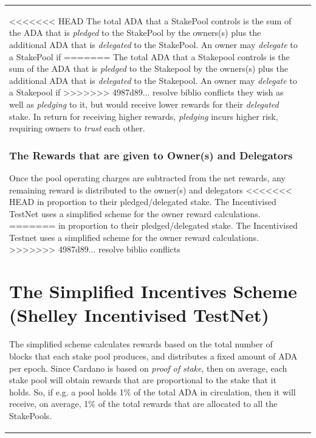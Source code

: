 \documentclass[11pt,a4paper,dvipsnames,twosided,final]{article}
\newcommand{\ada}{ADA{}}
\newcommand{\cardano}[1]{Cardano}
\begin{document}
\begin{tabular}{||l|l||}
\noindent
<<<<<<< HEAD
The total \ada{} that a StakePool controls is the sum of the \ada{} that is \emph{pledged} to the StakePool by the owners(s) plus
the additional \ada{} that is \emph{delegated} to the StakePool.  An owner may \emph{delegate} to a StakePool if
=======
The total \ada{} that a Stakepool controls is the sum of the \ada{} that is \emph{pledged} to the Stakepool by the owners(s) plus
the additional \ada{} that is \emph{delegated} to the Stakepool.  An owner may \emph{delegate} to a Stakepool if
>>>>>>> 4987d89... resolve biblio conflicts
they wish as well as \emph{pledging} to it, but would receive lower rewards for their \emph{delegated} stake.
In return for receiving higher rewards, \emph{pledging} incurs higher risk, requiring owners to \emph{trust} each other.


\subsubsection*{The Rewards that are given to Owner(s) and Delegators}

Once the pool operating charges are subtracted from the net rewards, any remaining reward is distributed to the owner(s) and delegators
<<<<<<< HEAD
in proportion to their pledged/delegated stake.  The Incentivised TestNet uses a simplified scheme for the owner reward calculations.
=======
in proportion to their pledged/delegated stake.  The Incentivised Testnet uses a simplified scheme for the owner reward calculations.
>>>>>>> 4987d89... resolve biblio conflicts


\clearpage
\section{The Simplified Incentives Scheme (Shelley Incentivised TestNet)}
\label{sec:TestNet}

The simplified scheme calculates rewards based on the total number of blocks that each stake pool produces,
and distributes a fixed amount of \ada{} per epoch.
Since \cardano{} is based on \emph{proof of stake}, then on average, each stake pool will obtain
rewards that are proportional to the stake that it holds.  So, if e.g. a pool holds 1\% of the total
\ada{} in circulation, then it will receive, on average, 1\% of the total rewards that are allocated to all the
StakePools.


\end{tabular}
\end{document}
